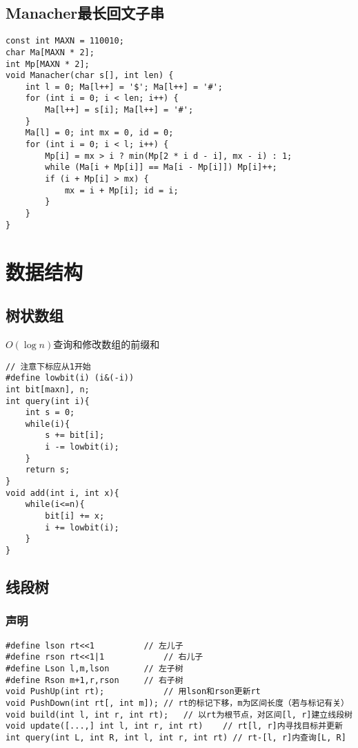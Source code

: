 \documentclass[a4paper]{article}
\begin{document}
\subsection{Manacher最长回文子串}
\begin{lstlisting}
const int MAXN = 110010;
char Ma[MAXN * 2];
int Mp[MAXN * 2];
void Manacher(char s[], int len) {
    int l = 0; Ma[l++] = '$'; Ma[l++] = '#';
    for (int i = 0; i < len; i++) {
        Ma[l++] = s[i]; Ma[l++] = '#';
    }
    Ma[l] = 0; int mx = 0, id = 0;
    for (int i = 0; i < l; i++) {
        Mp[i] = mx > i ? min(Mp[2 * i d - i], mx - i) : 1;
        while (Ma[i + Mp[i]] == Ma[i - Mp[i]]) Mp[i]++;
        if (i + Mp[i] > mx) {
            mx = i + Mp[i]; id = i;
        }
    }
}
\end{lstlisting}
\clearpage
\section{数据结构}
\subsection{树状数组}
$O(\log n)$查询和修改数组的前缀和\begin{lstlisting}
// 注意下标应从1开始
#define lowbit(i) (i&(-i))
int bit[maxn], n; 
int query(int i){
	int s = 0;
	while(i){
		s += bit[i];
		i -= lowbit(i);
	}
	return s;
}
void add(int i, int x){
	while(i<=n){
		bit[i] += x;
		i += lowbit(i);
	}
}
\end{lstlisting}
\subsection{线段树}
\subsubsection{声明}
\begin{lstlisting}
#define lson rt<<1			// 左儿子
#define rson rt<<1|1			// 右儿子
#define Lson l,m,lson		// 左子树
#define Rson m+1,r,rson 	// 右子树
void PushUp(int rt);			// 用lson和rson更新rt
void PushDown(int rt[, int m]);	// rt的标记下移，m为区间长度（若与标记有关）
void build(int l, int r, int rt);	// 以rt为根节点，对区间[l, r]建立线段树
void update([...,] int l, int r, int rt)	// rt[l, r]内寻找目标并更新
int query(int L, int R, int l, int r, int rt) // rt-[l, r]内查询[L, R] 
\end{lstlisting}
\end{document}
